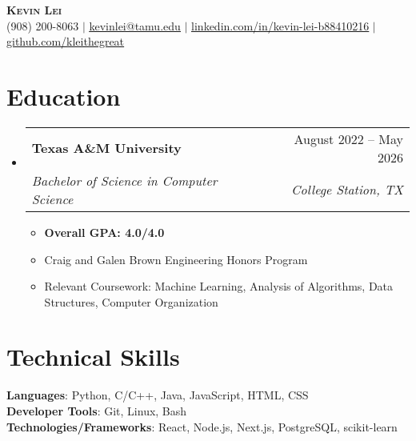 \documentclass[letterpaper,11pt]{article}
\makeatletter
\newcommand{\resumeItem}[1]{
  \item\small{
    {#1 \vspace{-2pt}}
  }
}
\newcommand{\resumeSubheading}[4]{
  \vspace{-5pt}\item
    \begin{tabular*}{0.97\textwidth}[t]{l@{\extracolsep{\fill}}r}
      \textbf{#1} & #2 \\
      \textit{\small#3} & \textit{\small #4} \\
    \end{tabular*}\vspace{-5pt}
}
\newcommand{\resumeSubHeadingListStart}{\begin{itemize}[leftmargin=0.15in, label={}]}
\newcommand{\resumeSubHeadingListEnd}{\end{itemize}}
\newcommand{\resumeItemListStart}{\begin{itemize}}
\newcommand{\resumeItemListEnd}{\end{itemize}\vspace{-5pt}}
\makeatother
\begin{document}

\begin{center}
    \textbf{\huge \scshape Kevin Lei} \\ \vspace{1pt}
    \small (908) 200-8063 $|$ \href{mailto:x@x.com}{\underline{kevinlei@tamu.edu}} $|$ 
    \href{https://www.linkedin.com/in/kevin-lei-b88410216/}{\underline{linkedin.com/in/kevin-lei-b88410216}} $|$
    \href{https://www.github.com/kleithegreat}{\underline{github.com/kleithegreat}}
\end{center}


\section{Education}
  \resumeSubHeadingListStart
    \resumeSubheading
      {Texas A\&M University}{August 2022 -- May 2026}
      {Bachelor of Science in Computer Science}{College Station, TX}
      \resumeItemListStart
        \resumeItem{\textbf{Overall GPA: 4.0/4.0}}
        \resumeItem{Craig and Galen Brown Engineering Honors Program}
        \resumeItem{Relevant Coursework: Machine Learning, Analysis of Algorithms, Data Structures, Computer Organization}
      \resumeItemListEnd
  \resumeSubHeadingListEnd

\section{Technical Skills}
\begin{itemize}[leftmargin=0.15in, label={}]
    \small{\item{
    \textbf{Languages}{: Python, C/C++, Java, JavaScript, HTML, CSS} \\
    \textbf{Developer Tools}{: Git, Linux, Bash} \\
    \textbf{Technologies/Frameworks}{: React, Node.js, Next.js, PostgreSQL, scikit-learn} \\
    }}
\end{itemize}
\end{document}
